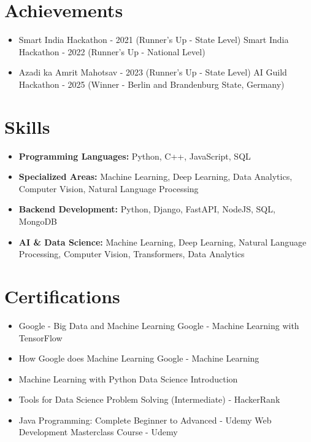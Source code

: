 \documentclass[a4paper,10pt]{article}
\begin{document}
\section*{Achievements}
\begin{itemize}
\item Smart India Hackathon - 2021 (Runner's Up - State Level) \hfill Smart India Hackathon - 2022 (Runner's Up - National Level)
\item Azadi ka Amrit Mahotsav - 2023 (Runner's Up - State Level) \hfill AI Guild Hackathon - 2025 (Winner - Berlin and Brandenburg State, Germany)
\end{itemize}

\section*{Skills}
\begin{itemize}
  \item \textbf{Programming Languages:} Python, C++, JavaScript, SQL
  \item \textbf{Specialized Areas:} Machine Learning, Deep Learning, Data Analytics, Computer Vision, Natural Language Processing
  \item \textbf{Backend Development:} Python, Django, FastAPI, NodeJS, SQL, MongoDB
  \item \textbf{AI \& Data Science:} Machine Learning, Deep Learning, Natural Language Processing, Computer Vision, Transformers, Data Analytics
\end{itemize}

\section*{Certifications}
\begin{itemize}
\item Google - Big Data and Machine Learning \hfill Google - Machine Learning with TensorFlow
\item How Google does Machine Learning \hfill Google - Machine Learning
\item Machine Learning with Python \hfill Data Science Introduction
\item Tools for Data Science \hfill Problem Solving (Intermediate) - HackerRank
\item Java Programming: Complete Beginner to Advanced - Udemy \hfill Web Development Masterclass Course - Udemy
\end{itemize}
\end{document}
